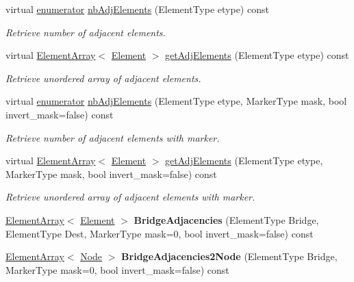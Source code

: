 \begin{DoxyCompactItemize}
\item 
virtual \hyperlink{classINMOST_1_1Storage_ae333dfced6fa9cfde0c8e7dcf1b0cc2b}{enumerator} \hyperlink{classINMOST_1_1Element_a11ebdafff96a8074de4c89529f7ddf89}{nb\-Adj\-Elements} (Element\-Type etype) const 
\begin{DoxyCompactList}\small\item\em Retrieve number of adjacent elements. \end{DoxyCompactList}\item 
virtual \hyperlink{classINMOST_1_1ElementArray}{Element\-Array}$<$ \hyperlink{classINMOST_1_1Element}{Element} $>$ \hyperlink{classINMOST_1_1Element_a237d4b838a71b5bb956b70bfe65d12ca}{get\-Adj\-Elements} (Element\-Type etype) const 
\begin{DoxyCompactList}\small\item\em Retrieve unordered array of adjacent elements. \end{DoxyCompactList}\item 
virtual \hyperlink{classINMOST_1_1Storage_ae333dfced6fa9cfde0c8e7dcf1b0cc2b}{enumerator} \hyperlink{classINMOST_1_1Element_aacec7f43efcad9d16064e34854f094e4}{nb\-Adj\-Elements} (Element\-Type etype, Marker\-Type mask, bool invert\-\_\-mask=false) const 
\begin{DoxyCompactList}\small\item\em Retrieve number of adjacent elements with marker. \end{DoxyCompactList}\item 
virtual \hyperlink{classINMOST_1_1ElementArray}{Element\-Array}$<$ \hyperlink{classINMOST_1_1Element}{Element} $>$ \hyperlink{classINMOST_1_1Element_ae1b2cbfce7af2e3f38f5a19d2a9a30a1}{get\-Adj\-Elements} (Element\-Type etype, Marker\-Type mask, bool invert\-\_\-mask=false) const 
\begin{DoxyCompactList}\small\item\em Retrieve unordered array of adjacent elements with marker. \end{DoxyCompactList}\item 
\hypertarget{classINMOST_1_1Element_a57707f37922d422779109921f2b75785}{\hyperlink{classINMOST_1_1ElementArray}{Element\-Array}$<$ \hyperlink{classINMOST_1_1Element}{Element} $>$ {\bfseries Bridge\-Adjacencies} (Element\-Type Bridge, Element\-Type Dest, Marker\-Type mask=0, bool invert\-\_\-mask=false) const }\label{classINMOST_1_1Element_a57707f37922d422779109921f2b75785}

\item 
\hypertarget{classINMOST_1_1Element_a687d29f44e125a63f020f8fd87cb7f80}{\hyperlink{classINMOST_1_1ElementArray}{Element\-Array}$<$ \hyperlink{classINMOST_1_1Node}{Node} $>$ {\bfseries Bridge\-Adjacencies2\-Node} (Element\-Type Bridge, Marker\-Type mask=0, bool invert\-\_\-mask=false) const }\label{classINMOST_1_1Element_a687d29f44e125a63f020f8fd87cb7f80}


\end{DoxyCompactItemize}
